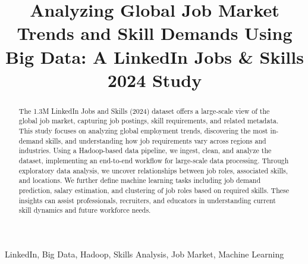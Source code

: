 \documentclass[conference]{IEEEtran}
\begin{document}
\title{Analyzing Global Job Market Trends and Skill Demands Using Big Data: A LinkedIn Jobs \& Skills 2024 Study}

\author{
\and
{}
\and
{}
}

\maketitle

\begin{abstract}
The 1.3M LinkedIn Jobs and Skills (2024) dataset offers a large-scale view of the global job market, capturing job postings, skill requirements, and related metadata. This study focuses on analyzing global employment trends, discovering the most in-demand skills, and understanding how job requirements vary across regions and industries. Using a Hadoop-based data pipeline, we ingest, clean, and analyze the dataset, implementing an end-to-end workflow for large-scale data processing. Through exploratory data analysis, we uncover relationships between job roles, associated skills, and locations. We further define machine learning tasks including job demand prediction, salary estimation, and clustering of job roles based on required skills. These insights can assist professionals, recruiters, and educators in understanding current skill dynamics and future workforce needs.
\end{abstract}

\begin{IEEEkeywords}
LinkedIn, Big Data, Hadoop, Skills Analysis, Job Market, Machine Learning
\end{IEEEkeywords}
\end{document}
